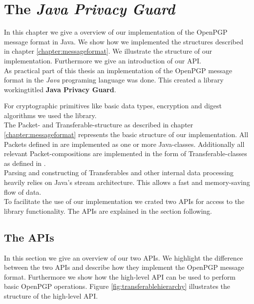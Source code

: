 \chapter{The \textit{Java Privacy Guard}} \label{chapter:jpg}

In this chapter we give a overview of our implementation of the OpenPGP message format in Java. We show how we implemented the structures described in chapter \ref{chapter:messageformat}. We illustrate the structure of our implementation. Furthermore we give an introduction of our API. \\


As practical part of this thesis an implementation of the OpenPGP message format \cite{RFC4880} in the \textit{Java} programing language was done. This created a library workingtitled \textbf{Java Privacy Guard}.

For cryptographic primitives like basic data types, encryption and digest algorithms we used the  library. \\

The Packet- and Transferable-structure as described in chapter \ref{chapter:messageformat} represents the basic structure of our implementation. All Packets defined in \cite[section 5]{RFC4880} are implemented as one or more Java-classes. Additionally all relevant Packet-compositions are implemented in the form of Transferable-classes as defined in \cite[section 11]{RFC4880}. \\

Parsing and constructing of Transferables and other internal data processing heavily relies on Java's stream architecture. This allows a fast and memory-saving flow of data. \\

To facilitate the use of our implementation we crated two APIs for access to the library functionality. The APIs are explained in the section following.

\section{The APIs}

In this section we give an overview of our two APIs. We highlight the difference between the two APIs and describe how they implement the OpenPGP message format. Furthermore we show how the high-level API can be used to perform basic OpenPGP operations. Figure \ref{fig:transferablehierarchy} illustrates the structure of the high-level API. \\

